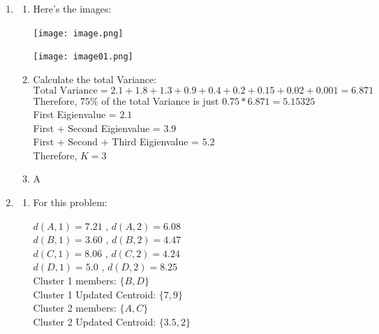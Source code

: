 \documentclass[12pt]{article}
\begin{document}
\begin{enumerate}
\item
\begin{enumerate}
\item 
Here's the images: \\
\begin{center}
  \texttt{[image: image.png]}
\end{center}

\begin{center}
  \texttt{[image: image01.png]}
\end{center}
\item
  Calculate the total Variance:
  \[ \text{Total Variance} = 2.1 +1.8 + 1.3 + 0.9 + 0.4 + 0.2 + 0.15 + 0.02 + 0.001 = 6.871\]
  Therefore, \(75\%\) of the total Variance is just \(0.75 * 6.871 = 5.15325\)\\
  First Eigienvalue = \(2.1\)\\
  First  + Second Eigienvalue = \(3.9\)\\
  First + Second + Third Eigienvalue = \(5.2\)\\
  Therefore, \(K = 3\)
\item
  A
\end{enumerate}
\item
\begin{enumerate}
\item
  For this problem:\\
  \begin{tcolorbox}[title = 1st Iter, myblock]
    \(d(A,1) = 7.21\) , \(d(A, 2) = 6.08\) \\
    \(d(B,1) = 3.60\) , \(d(B, 2) =4.47 \) \\
    \(d(C,1) = 8.06\) , \(d(C, 2) =4.24  \) \\
    \(d(D,1) = 5.0 \) , \(d(D, 2) =8.25\) \\
    Cluster 1 members: \(\{ B, D\}\) \\
    Cluster 1 Updated Centroid: \(\{7,9\}\)\\
    Cluster 2 members: \(\{A, C\}\)\\
    Cluster 2 Updated Centroid: \(\{3.5, 2\}\)\\
    

\end{tcolorbox}
\end{enumerate}
\end{enumerate}
\end{document}
